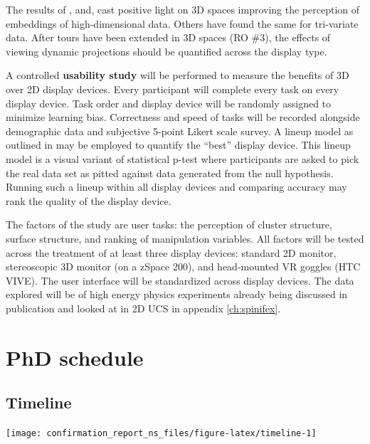 \documentclass{monashthesis}
\begin{document}
The results of \textcite{wagner_filho_immersive_2018},
\textcite{nelson_xgobi_1998} and, \textcite{arms_benefits_1999} cast
positive light on 3D spaces improving the perception of embeddings of
high-dimensional data. Others have found the same for tri-variate data.
After tours have been extended in 3D spaces (RO \#3), the effects of
viewing dynamic projections should be quantified across the display
type.

A controlled \textbf{usability study} will be performed to measure the
benefits of 3D over 2D display devices. Every participant will complete
every task on every display device. Task order and display device will
be randomly assigned to minimize learning bias. Correctness and speed of
tasks will be recorded alongside demographic data and subjective 5-point
Likert scale survey. A lineup model as outlined in
\textcite{hofmann_graphical_2012} may be employed to quantify the
``best'' display device. This lineup model is a visual variant of
statistical p-test where participants are asked to pick the real data
set as pitted against data generated from the null hypothesis. Running
such a lineup within all display devices and comparing accuracy may rank
the quality of the display device.

The factors of the study are user tasks: the perception of cluster
structure, surface structure, and ranking of manipulation variables. All
factors will be tested across the treatment of at least three display
devices: standard 2D monitor, stereoscopic 3D monitor (on a zSpace 200),
and head-mounted VR goggles (HTC VIVE). The user interface will be
standardized across display devices. The data explored will be of high
energy physics experiments already being discussed in publication
\autocites{wang_visualizing_2018}{cook_dynamical_2018} and looked at in
2D UCS in appendix \ref{ch:spinifex}.

\chapter{PhD schedule}\label{ch:timeline}

\section{Timeline}\label{timeline}

\begin{center}\texttt{[image: confirmation\_report\_ns\_files/figure-latex/timeline-1]} \end{center}
\end{document}
